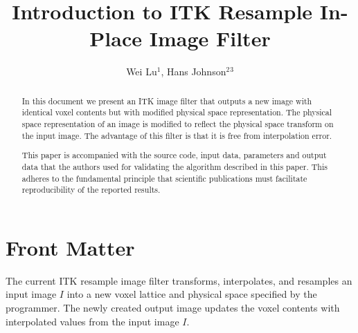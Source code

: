 \documentclass{InsightArticle}
\title{Introduction to ITK Resample In-Place Image Filter}
\author{Wei Lu$^{1}$, Hans Johnson$^{2}$$^{3}$}
\newcommand{\IJhandlerIDnumber}{3224}
\begin{document}
%
%
\IJhandlefooter{\IJhandlerIDnumber}


\ifpdf
\else
\fi


\maketitle


\ifhtml
\chapter*{Front Matter\label{front}}
\fi


\begin{abstract}
\noindent
In this document we present an ITK
\cite{ITKSoftwareGuideSecondEdition} image filter that outputs a new
image with identical voxel contents but with modified physical space
representation. The physical space representation of an image is
modified to reflect the physical space transform on the input
image. The advantage of this filter is that it is free from
interpolation error.

This paper is accompanied with the source code, input data, parameters
and output data that the authors used for validating the algorithm
described in this paper. This adheres to the fundamental principle
that scientific publications must facilitate reproducibility of the
reported results.

\end{abstract}

\IJhandlenote{\IJhandlerIDnumber}

\tableofcontents

The current ITK resample image filter transforms, interpolates, and resamples an input image $I$ into a new voxel lattice and physical space specified by the programmer.   The newly created output image updates the voxel contents with interpolated values from the input image $I$.
\end{document}
